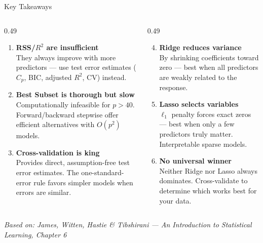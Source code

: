 \documentclass[ignorenonframetext,]{beamer}
\begin{document}
\begin{frame}{Key Takeaways}
\begin{columns}[T]
\begin{column}{0.49\textwidth}
\scriptsize
\begin{enumerate}
	\item \textbf{RSS/$R^2$ are insufficient}\\
	They always improve with more predictors --- use test error estimates ($C_p$, BIC, adjusted $R^2$, CV) instead.
	\item \textbf{Best Subset is thorough but slow}\\
	Computationally infeasible for $p > 40$. Forward/backward stepwise offer efficient alternatives with $O(p^2)$ models.
	\item \textbf{Cross-validation is king}\\
	Provides direct, assumption-free test error estimates. The one-standard-error rule favors simpler models when errors are similar.
\end{enumerate}
\end{column}
\begin{column}{0.49\textwidth}
\scriptsize
\begin{enumerate}
	\setcounter{enumi}{3}
	\item \textbf{Ridge reduces variance}\\
	By shrinking coefficients toward zero --- best when all predictors are weakly related to the response.
	\item \textbf{Lasso selects variables}\\
	$\ell_1$ penalty forces exact zeros --- best when only a few predictors truly matter. Interpretable sparse models.
	\item \textbf{No universal winner}\\
	Neither Ridge nor Lasso always dominates. Cross-validate to determine which works best for your data.
\end{enumerate}
\end{column}
\end{columns}

\centering
{\tiny\emph{Based on: James, Witten, Hastie \& Tibshirani --- An Introduction to Statistical Learning, Chapter 6}}
\end{frame}
\end{document}
